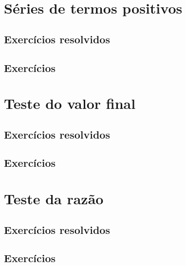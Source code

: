 \construirExer


\section{Séries de termos positivos}
\construirSec

\subsection*{Exercícios resolvidos}

\construirExeresol


\subsection*{Exercícios}

\construirExer


\section{Teste do valor final}
\construirSec

\subsection*{Exercícios resolvidos}

\construirExeresol


\subsection*{Exercícios}

\construirExer


\section{Teste da razão}
\construirSec

\subsection*{Exercícios resolvidos}

\construirExeresol


\subsection*{Exercícios}

